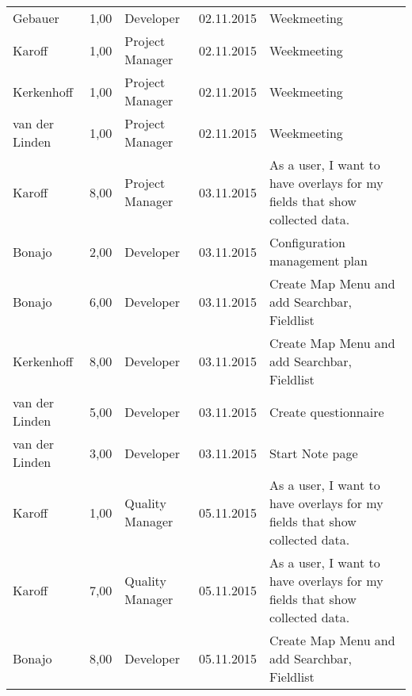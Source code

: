 \begin{longtable}{ l r p{2cm} c p{4cm} }
		Gebauer                 & 1,00           & Developer             & 02.11.2015    & Weekmeeting                                                                     \\
		Karoff                  & 1,00           & Project Manager       & 02.11.2015    & Weekmeeting                                                                     \\
		Kerkenhoff              & 1,00           & Project Manager       & 02.11.2015    & Weekmeeting                                                                     \\
		van der Linden          & 1,00           & Project Manager       & 02.11.2015    & Weekmeeting                                                                     \\
		Karoff                  & 8,00           & Project Manager       & 03.11.2015    & As a user, I want to have overlays for my fields that show collected data.      \\
		Bonajo                  & 2,00           & Developer             & 03.11.2015    & Configuration management plan                                                   \\
		Bonajo                  & 6,00           & Developer             & 03.11.2015    & Create Map Menu and add Searchbar, Fieldlist                                    \\
		Kerkenhoff              & 8,00           & Developer             & 03.11.2015    & Create Map Menu and add Searchbar, Fieldlist                                    \\
		van der Linden          & 5,00           & Developer             & 03.11.2015    & Create questionnaire                                                             \\
		van der Linden          & 3,00           & Developer             & 03.11.2015    & Start Note page                                                                 \\
		Karoff                  & 1,00           & Quality Manager       & 05.11.2015    & As a user, I want to have overlays for my fields that show collected data.      \\
		Karoff                  & 7,00           & Quality Manager       & 05.11.2015    & As a user, I want to have overlays for my fields that show collected data.      \\
		Bonajo                  & 8,00           & Developer             & 05.11.2015    & Create Map Menu and add Searchbar, Fieldlist                                    \\

\end{longtable}

